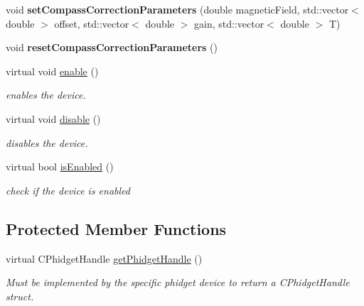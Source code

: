 \begin{DoxyCompactItemize}
\item 
\hypertarget{classdrobot_1_1device_1_1vestibular_1_1PhidgetVestibular_ac7b70470063bc4cfd8d0d2096610deb9}{void {\bfseries set\-Compass\-Correction\-Parameters} (double magnetic\-Field, std\-::vector$<$ double $>$ offset, std\-::vector$<$ double $>$ gain, std\-::vector$<$ double $>$ T)}\label{classdrobot_1_1device_1_1vestibular_1_1PhidgetVestibular_ac7b70470063bc4cfd8d0d2096610deb9}

\item 
\hypertarget{classdrobot_1_1device_1_1vestibular_1_1PhidgetVestibular_ae8f7d60741e9f7b1ec07824a38347e0d}{void {\bfseries reset\-Compass\-Correction\-Parameters} ()}\label{classdrobot_1_1device_1_1vestibular_1_1PhidgetVestibular_ae8f7d60741e9f7b1ec07824a38347e0d}

\item 
virtual void \hyperlink{classdrobot_1_1device_1_1vestibular_1_1PhidgetVestibular_a23ef10594aaaddb5f3f2a9908b531c23}{enable} ()
\begin{DoxyCompactList}\small\item\em enables the device. \end{DoxyCompactList}\item 
virtual void \hyperlink{classdrobot_1_1device_1_1vestibular_1_1PhidgetVestibular_ae1887d6d36bf2a25925663e35bd6d57d}{disable} ()
\begin{DoxyCompactList}\small\item\em disables the device. \end{DoxyCompactList}\item 
virtual bool \hyperlink{classdrobot_1_1device_1_1vestibular_1_1PhidgetVestibular_aed99fc288425612c447cc0df4938d9cd}{is\-Enabled} ()
\begin{DoxyCompactList}\small\item\em check if the device is enabled \end{DoxyCompactList}\end{DoxyCompactItemize}
\subsection*{Protected Member Functions}
\begin{DoxyCompactItemize}
\item 
virtual C\-Phidget\-Handle \hyperlink{classdrobot_1_1device_1_1vestibular_1_1PhidgetVestibular_a8292d6ebbc1910eca84081cf76bf3afe}{get\-Phidget\-Handle} ()
\begin{DoxyCompactList}\small\item\em Must be implemented by the specific phidget device to return a C\-Phidget\-Handle struct. \end{DoxyCompactList}\end{DoxyCompactItemize}
